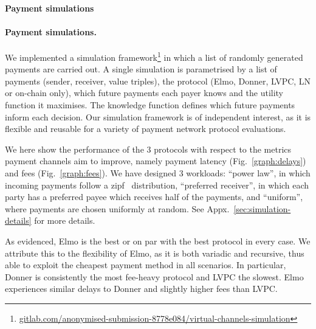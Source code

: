   \makeatletter%
    {\paragraph{Payment simulations}}%
    {\paragraph{Payment simulations.}}%
  \makeatother%
  We implemented a simulation
  framework\footnote{\url{gitlab.com/anonymised-submission-8778e084/virtual-channels-simulation}}
  in which a list of randomly generated payments are carried out.
  A single simulation is parametrised by a list of payments
  (sender, receiver, value triples), the protocol (Elmo, Donner, LVPC, LN or
  on-chain only), which future payments each payer knows and the utility
  function it maximises. The knowledge function defines which future payments
  inform each decision.
  Our simulation framework is of independent interest, as it is flexible
  and reusable for a variety of payment network protocol evaluations.

  We here
  show the performance of the $3$ protocols with respect to the metrics payment
  channels aim to improve, namely payment latency (Fig.~\ref{graph:delays}) and
  fees (Fig.~\ref{graph:fees}). We have designed $3$
  workloads: ``power law'', in which incoming payments follow a
  zipf~\cite{powers-1998-applications} distribution, ``preferred receiver'', in
  which each party has a preferred payee which receives half of the payments,
  and ``uniform'', where payments are chosen uniformly at random. See
  Appx.~\ref{sec:simulation-details} for more details.

  As evidenced, Elmo is the best or on par with the best protocol in every
  case. We attribute this to the flexibility of Elmo, as it is both variadic and
  recursive, thus able to exploit the cheapest payment method in all scenarios.
  In particular, Donner is consistently the most fee-heavy protocol and LVPC the
  slowest. Elmo experiences similar delays to Donner and slightly higher fees
  than LVPC.


